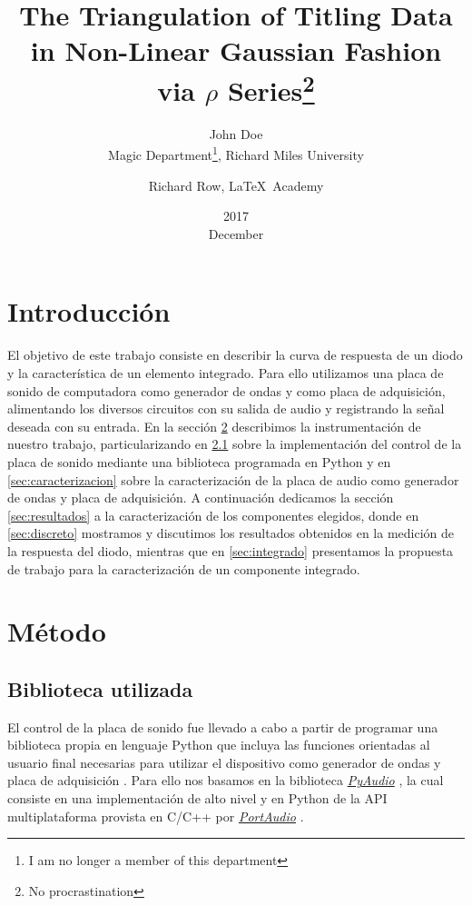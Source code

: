 \documentclass[a4paper,11pt]{article}
\title{The Triangulation of Titling Data in Non-Linear Gaussian Fashion via $\rho$ Series\thanks{No procrastination}}
\date{2017\\ December}
\author{John Doe\\ Magic Department\thanks{I am no longer a member of this department}, Richard Miles University 
\and Richard Row, \LaTeX\ Academy}
\begin{document}
\maketitle

\section{Introducción}

El objetivo de este trabajo consiste en describir la curva de respuesta de un diodo y la característica de un elemento integrado. Para ello utilizamos una placa de sonido de computadora como generador de ondas y como placa de adquisición, alimentando los diversos circuitos con su salida de audio y registrando la señal deseada con su entrada. En la sección \ref{sec:metodo} describimos la instrumentación de nuestro trabajo, particularizando en \ref{sec:biblioteca} sobre la implementación del control de la placa de sonido mediante una biblioteca programada en Python y en \ref{sec:caracterizacion} sobre la caracterización de la placa de audio como generador de ondas y placa de adquisición. A continuación dedicamos la sección \ref{sec:resultados} a la caracterización de los componentes elegidos, donde en \ref{sec:discreto} mostramos y discutimos los resultados obtenidos en la medición de la respuesta del diodo, mientras que en \ref{sec:integrado} presentamos la propuesta de trabajo para la caracterización de un componente integrado.

\section{Método}
\label{sec:metodo}

	\subsection{Biblioteca utilizada}
	\label{sec:biblioteca}
	
	El control de la placa de sonido fue llevado a cabo a partir de programar una biblioteca propia en lenguaje Python que incluya las funciones orientadas al usuario final necesarias para utilizar el dispositivo como generador de ondas y placa de adquisición \cite{repo}. Para ello nos basamos en la biblioteca \emph{\href{https://people.csail.mit.edu/hubert/pyaudio/}{PyAudio}} \cite{pyaudio}, la cual consiste en una implementación de alto nivel y en Python de la API multiplataforma provista en C/C++ por \emph{\href{http://www.portaudio.com/}{PortAudio}} \cite{portaudio}.
	
\end{document}
